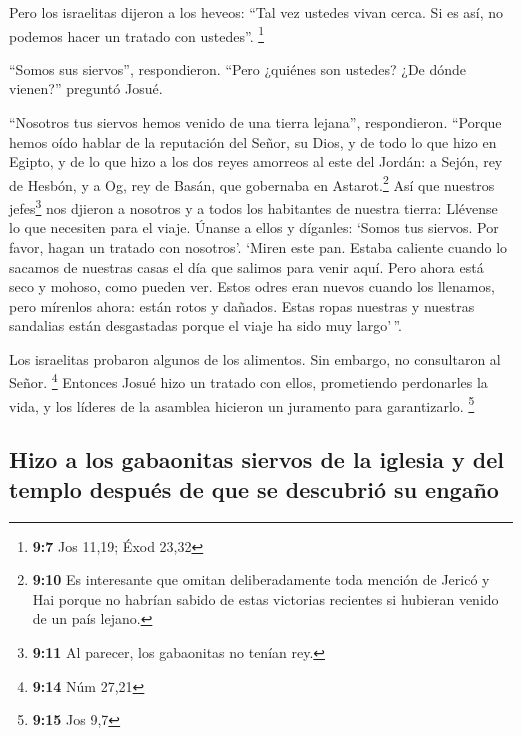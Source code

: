  Pero los israelitas dijeron a los heveos: ``Tal vez
ustedes vivan cerca. Si es así, no podemos hacer un tratado con
ustedes''. \footnote{\textbf{9:7} Jos 11,19; Éxod 23,32}

 ``Somos sus siervos'', respondieron. ``Pero ¿quiénes son
ustedes? ¿De dónde vienen?'' preguntó Josué.

 ``Nosotros tus siervos hemos venido de una tierra
lejana'', respondieron. ``Porque hemos oído hablar de la reputación del
Señor, su Dios, y de todo lo que hizo en Egipto,  y de lo
que hizo a los dos reyes amorreos al este del Jordán: a Sejón, rey de
Hesbón, y a Og, rey de Basán, que gobernaba en Astarot.\footnote{\textbf{9:10}
  Es interesante que omitan deliberadamente toda mención de Jericó y Hai
  porque no habrían sabido de estas victorias recientes si hubieran
  venido de un país lejano.}  Así que nuestros
jefes\footnote{\textbf{9:11} Al parecer, los gabaonitas no tenían rey.}
nos djieron a nosotros y a todos los habitantes de nuestra tierra:
Llévense lo que necesiten para el viaje. Únanse a ellos y díganles:
`Somos tus siervos. Por favor, hagan un tratado con nosotros'.
 `Miren este pan. Estaba caliente cuando lo sacamos de
nuestras casas el día que salimos para venir aquí. Pero ahora está seco
y mohoso, como pueden ver.  Estos odres eran nuevos
cuando los llenamos, pero mírenlos ahora: están rotos y dañados. Estas
ropas nuestras y nuestras sandalias están desgastadas porque el viaje ha
sido muy largo'\,''.

 Los israelitas probaron algunos de los alimentos. Sin
embargo, no consultaron al Señor. \footnote{\textbf{9:14} Núm 27,21}
 Entonces Josué hizo un tratado con ellos, prometiendo
perdonarles la vida, y los líderes de la asamblea hicieron un juramento
para garantizarlo. \footnote{\textbf{9:15} Jos 9,7}

\hypertarget{hizo-a-los-gabaonitas-siervos-de-la-iglesia-y-del-templo-despuuxe9s-de-que-se-descubriuxf3-su-engauxf1o}{%
\subsection{Hizo a los gabaonitas siervos de la iglesia y del templo
después de que se descubrió su
engaño}\label{hizo-a-los-gabaonitas-siervos-de-la-iglesia-y-del-templo-despuuxe9s-de-que-se-descubriuxf3-su-engauxf1o}}

